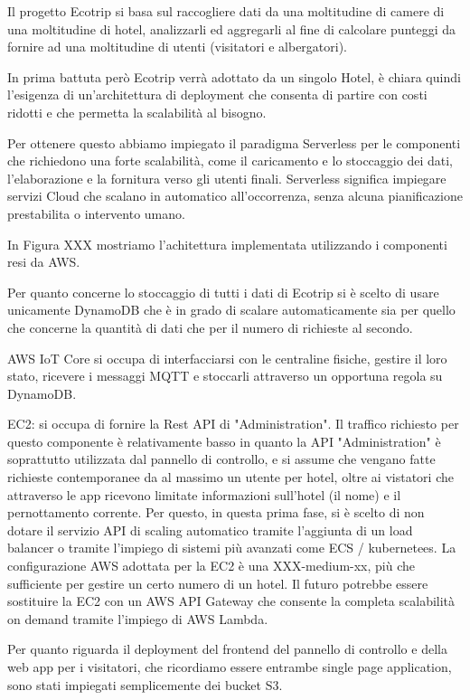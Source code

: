 Il progetto Ecotrip si basa sul raccogliere dati da una moltitudine di camere di una moltitudine di hotel, 
analizzarli ed aggregarli al fine di calcolare punteggi da fornire ad una moltitudine di utenti (visitatori e albergatori).

In prima battuta però Ecotrip verrà adottato da un singolo Hotel, è chiara quindi l'esigenza di un'architettura di deployment 
che consenta di partire con costi ridotti e che permetta la scalabilità al bisogno.

Per ottenere questo abbiamo impiegato il paradigma Serverless per le componenti che richiedono una forte scalabilità, 
come il caricamento e lo stoccaggio dei dati, l'elaborazione e la fornitura verso gli utenti finali. 
Serverless significa impiegare servizi Cloud che scalano in automatico all'occorrenza, senza alcuna pianificazione prestabilita o intervento umano.

In Figura XXX mostriamo l'achitettura implementata utilizzando i componenti resi da AWS.

Per quanto concerne lo stoccaggio di tutti i dati di Ecotrip si è scelto di usare unicamente DynamoDB che è in grado di scalare automaticamente sia per 
quello che concerne la quantità di dati che per il numero di richieste al secondo. 

AWS IoT Core si occupa di interfacciarsi con le centraline fisiche, gestire il loro stato, ricevere i messaggi MQTT e stoccarli attraverso un opportuna regola su DynamoDB.

EC2: si occupa di fornire la Rest API di "Administration". 
Il traffico richiesto per questo componente è relativamente basso in quanto la API "Administration" è soprattutto utilizzata dal pannello di controllo, 
e si assume che vengano fatte richieste contemporanee da al massimo un utente per hotel, 
oltre ai vistatori che attraverso le app ricevono limitate informazioni sull'hotel (il nome) e il pernottamento corrente.
Per questo, in questa prima fase, si è scelto di non dotare il servizio API di scaling automatico tramite l'aggiunta di un load balancer 
o tramite l'impiego di sistemi più avanzati come ECS / kubernetees.
La configurazione AWS adottata per la EC2 è una XXX-medium-xx, più che sufficiente per gestire un certo numero di un hotel.
Il futuro potrebbe essere sostituire la EC2 con un AWS API Gateway che consente la completa scalabilità on demand tramite l'impiego di AWS Lambda.

Per quanto riguarda il deployment del frontend del pannello di controllo e della web app per i visitatori, che ricordiamo essere entrambe single page application, 
sono stati impiegati semplicemente dei bucket S3. 

